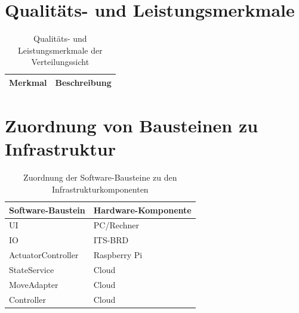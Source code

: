 \clearpage
\section{Qualitäts- und Leistungsmerkmale}
\begin{table}[h!]
\centering
\begin{tabular}{|l|p{10cm}|}
\hline
\textbf{Merkmal} & \textbf{Beschreibung} \\ \hline
\end{tabular}
\caption{Qualitäts- und Leistungsmerkmale der Verteilungssicht}
\end{table}

\section{Zuordnung von Bausteinen zu Infrastruktur}

\begin{table}[h!]
\centering
\begin{tabular}{|l|l|}
\hline
\textbf{Software-Baustein} & \textbf{Hardware-Komponente} \\ \hline
UI & PC/Rechner \\ \hline
IO & ITS-BRD \\ \hline
ActuatorController & Raspberry Pi \\ \hline
StateService & Cloud \\ \hline
MoveAdapter & Cloud \\ \hline
Controller & Cloud \\ \hline
\end{tabular}
\caption{Zuordnung der Software-Bausteine zu den Infrastrukturkomponenten}
\end{table}

